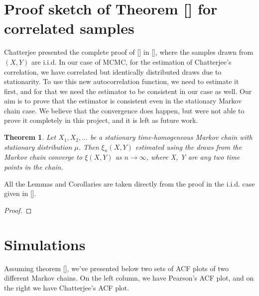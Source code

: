 \documentclass{article}
\newtheorem{theorem}{Theorem}[section]
\begin{document}
\section{Proof sketch of Theorem [] for correlated samples}
	Chatterjee presented the complete proof of [] in [], where the samples drawn from $(X, Y)$ are i.i.d.
	In our case of MCMC, for the estimation of Chatterjee's correlation, we have correlated but identically distributed draws due to stationarity.
	To use this new autocorrelation function, we need to estimate it first, and for that we need the estimator to be consistent in our case as well.
	Our aim is to prove that the estimator is consistent even in the stationary Markov chain case.
	We believe that the convergence does happen, but were not able to prove it completely in this project, and it is left as future work.

	\begin{theorem}
		Let $X_1, X_2, \dots$ be a stationary time-homogeneous Markov chain with stationary distribution $\mu$.
		Then $\xi_n(X, Y)$ estimated using the draws from the Markov chain converge to $\xi(X, Y)$ as $n \rightarrow \infty$, where X, Y are any two time points in the chain.
	\end{theorem}
	All the Lemmas and Corollaries are taken directly from the proof in the i.i.d. case given in [].
	\begin{proof}

	\end{proof}

\section{Simulations}
	Assuming theorem [], we've presented below two sets of ACF plots of two different Markov chains.
	On the left column, we have Pearson's ACF plot, and on the right we have Chatterjee's ACF plot.
\end{document}

